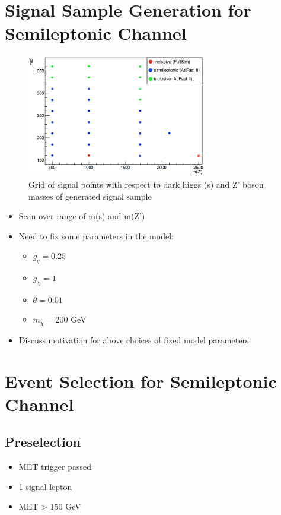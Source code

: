 \documentclass[12pt]{article}
\begin{document}
\section{Signal Sample Generation for Semileptonic Channel}
\begin{figure}[H]
	\centering
	\includegraphics[width=0.7\textwidth]{figures/SignalGrid.png}
	\caption{Grid of signal points with respect to dark higgs (s) and Z' boson masses of generated signal sample}
	\label{fig:signalgrid}
\end{figure}

\begin{itemize}
	\item Scan over range of m(s) and m(Z')
	\item Need to fix some parameters in the model:
	\begin{itemize}
		\item $g_{q} = 0.25$
		\item $g_{\chi} = 1$
		\item $\theta = 0.01$
		\item $m_{\chi} = 200$ GeV
	\end{itemize}
	\item Discuss motivation for above choices of fixed model parameters
\end{itemize}

\section{Event Selection for Semileptonic Channel}

\subsection{Preselection}
\begin{itemize}
\item MET trigger passed
\item 1 signal lepton
\item MET > 150 GeV
\end{itemize}
\end{document}
